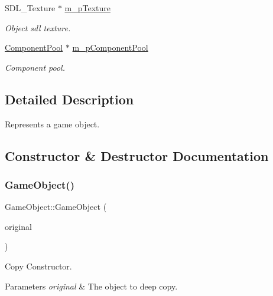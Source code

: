 \begin{DoxyCompactItemize}
\mbox{\label{class_game_object_af5dd439a453e4cc024c62737ae9e0cde}} 
S\+D\+L\+\_\+\+Texture $\ast$ \mbox{\hyperlink{class_game_object_af5dd439a453e4cc024c62737ae9e0cde}{m\+\_\+p\+Texture}}
\begin{DoxyCompactList}\small\item\em Object sdl texture. \end{DoxyCompactList}\item 
\mbox{\label{class_game_object_a8e0a971ff226fc54111b63b4d8ba570a}} 
\mbox{\hyperlink{class_component_pool}{Component\+Pool}} $\ast$ \mbox{\hyperlink{class_game_object_a8e0a971ff226fc54111b63b4d8ba570a}{m\+\_\+p\+Component\+Pool}}
\begin{DoxyCompactList}\small\item\em Component pool. \end{DoxyCompactList}\end{DoxyCompactItemize}


\subsection{Detailed Description}
Represents a game object. 

\subsection{Constructor \& Destructor Documentation}
\mbox{\label{class_game_object_a0cefa9305b62d18a11d7c1182fcbf5bc}} 
\subsubsection{\texorpdfstring{Game\+Object()}{GameObject()}}
{\footnotesize\ttfamily Game\+Object\+::\+Game\+Object (\begin{DoxyParamCaption}\item[{const \mbox{\hyperlink{class_game_object}{Game\+Object}} \&}]{original }\end{DoxyParamCaption})}



Copy Constructor. 


\begin{DoxyParams}{Parameters}
{\em original} & The object to deep copy. \\
\hline
\end{DoxyParams}


